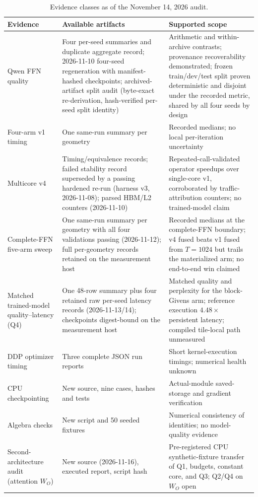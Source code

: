 \begin{table}[t]
\centering\small
\caption{Evidence classes as of the November 14, 2026 audit.}
\label{tab:evidence}
\begin{tabular}{p{.25\linewidth}p{.32\linewidth}p{.33\linewidth}}
\toprule
Evidence & Available artifacts & Supported scope \\
\midrule
Qwen FFN quality & Four per-seed summaries and duplicate aggregate record; 2026-11-10 four-seed regeneration with manifest-hashed checkpoints; archived-artifact split audit (byte-exact re-derivation, hash-verified per-seed split identity) & Arithmetic and within-archive contrasts; provenance recoverability demonstrated; frozen train/dev/test split proven deterministic and disjoint under the recorded metric, shared by all four seeds by design \\
Four-arm v1 timing & One same-run summary per geometry & Recorded medians; no local per-iteration uncertainty \\
Multicore v4 & Timing/equivalence records; failed stability record superseded by a passing hardened re-run (harness v3, 2026-11-08); parsed HBM/L2 counters (2026-11-10) & Repeated-call-validated operator speedups over single-core v1, corroborated by traffic-attribution counters; no trained-model claim \\
Complete-FFN five-arm sweep & One same-run summary per geometry with all four validations passing (2026-11-12); full per-geometry records retained on the measurement host & Recorded medians at the complete-FFN boundary; v4 fused beats v1 fused from $T{=}1024$ but trails the materialized arm; no end-to-end win claimed \\
Matched trained-model quality--latency (Q4) & One 48-row summary plus four retained raw per-seed latency records (2026-11-13/14); checkpoints digest-bound on the measurement host & Matched quality and perplexity for the block-Givens arm; reference execution $4.48\times$ persistent latency; compiled tile-local path unmeasured \\
DDP optimizer timing & Three complete JSON run reports & Short kernel-execution timings; numerical health unknown \\
CPU checkpointing & New source, nine cases, hashes and tests & Actual-module saved-storage and gradient verification \\
Algebra checks & New script and 50 seeded fixtures & Numerical consistency of identities; no model-quality evidence \\
Second-architecture audit (attention $W_O$) & New source (2026-11-16), executed report, script hash & Pre-registered CPU synthetic-fixture transfer of Q1, budgets, constant core, and Q3; Q2/Q4 on $W_O$ open \\
\bottomrule
\end{tabular}
\end{table}


